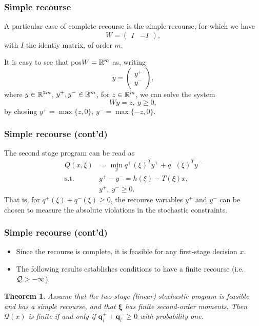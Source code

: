 \documentclass{beamer}
\newtheorem{theo}{Theorem}
\def\bxi{\boldsymbol\xi}
\def\bxi{\boldsymbol\xi}
\begin{document}
\begin{frame}
\frametitle{Simple recourse}

A particular case of complete recourse is the {\red simple recourse}, for which we have
\[
W = \begin{pmatrix} I & -I \end{pmatrix},
\]
with $I$ the identiy matrix, of order $m$.

\mbox{}

It is easy to see that pos$W = {\mathbb{R}}^m$ as, writing
$$
y = \begin{pmatrix}
	y^+ \\ y^-
\end{pmatrix},
$$
where $y \in {\mathbb{R}}^{2m}$, $y^+, y^- \in {\mathbb{R}}^m$, for $z \in {\mathbb{R}}^m$, we can solve the system
$$
Wy = z,\ y \geq 0,
$$
by chosing $y^+ = \max\{z,0\}$,  $y^- = \max\{-z,0\}$.

\end{frame}

\begin{frame}
\frametitle{Simple recourse (cont'd)}

The second stage program can be read as
\begin{align*}
Q(x,\xi) & = \min_y q^+(\xi)^Ty^+ + q^-(\xi)^Ty^- \\
\mbox{s.t. } & y^+ - y^- = h(\xi)-T(\xi)x,\\
& y^+,\ y^- \geq 0.
\end{align*}
That is, for $q^+(\xi) + q^-(\xi) \geq 0$, the recourse variables $y^+$ and $y^-$ can be chosen to %
measure the absolute violations in the stochastic constraints.

\end{frame}

\begin{frame}
\frametitle{Simple recourse (cont'd)}

\begin{itemize}
	\item 
Since the recourse is complete, it is feasible for any first-stage decision $x$.
\item
The following results establishes conditions to have a finite recourse (i.e. ${\mathcal{Q}} > -\infty$).
\end{itemize}

\begin{theo}
Assume that the two-stage (linear) stochastic program is feasible and has a simple recourse, and that $\bxi$ has finite second-order moments.
Then $\mathcal{Q}(x)$ is finite if and only if $\boldsymbol{q}_i^+ + \boldsymbol{q}_i^- \geq 0$ with probability one.
\end{theo}

\end{frame}
\end{document}
